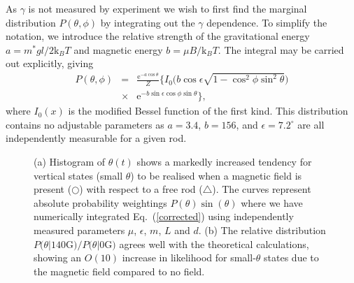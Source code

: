 \documentclass[aps,prl,reprint,twocolumn,superscriptaddress,showpacs]{revtex4-1}
\newcommand{\ee}{\mathrm{e}}
\newcommand{\kk}{\mathrm{k}_B}
\begin{document}
As $\gamma$ is not measured by experiment we wish to first find the marginal distribution $P(\theta,\phi)$ by integrating out the $\gamma$ dependence. To simplify the notation, we introduce the relative strength of the gravitational energy $a=m^*gl/2 \kk T$ and magnetic energy $b=\mu B/\kk T$. The integral may be carried out explicitly, giving
\begin{eqnarray}\label{corrected}
P(\theta,\phi)  & = & \frac{\ee^{-a\cos\theta}}{Z} \Big\{ I_0\Big( b\cos\epsilon\sqrt{1-\cos^2\phi\sin^2\theta} \Big) \nonumber\\
& \times &  \ee^{-b \sin\epsilon \cos\phi\sin\theta}\Big\}, \label{P_corrected}
\end{eqnarray}
where $I_0(x)$ is the modified Bessel function of the first kind. This distribution contains no adjustable parameters as $a=3.4$, $b=156$, and $\epsilon=7.2^\circ$ are all independently measurable for a given rod.
\begin{figure}
\centering
    \caption{\footnotesize (a) Histogram of $\theta(t)$ shows a markedly increased tendency for vertical states (small $\theta$) to be realised when a magnetic field is present ({\color{NavyBlue}$\bigcirc$}) with respect to a free rod ({\color{red}$\bigtriangleup$}). The curves represent absolute probability weightings $P(\theta) \sin(\theta)$ where we have numerically integrated Eq.\ (\ref{corrected}) using independently measured parameters $\mu$, $\epsilon$, $m$, $L$ and $d$. (b) The relative distribution $P(\theta | 140 $G$)/P(\theta | 0 $G$)$ agrees well with the theoretical calculations, showing an $O(10)$ increase in likelihood for small-$\theta$ states due to the magnetic field compared to no field.}
\end{figure}
\end{document}
